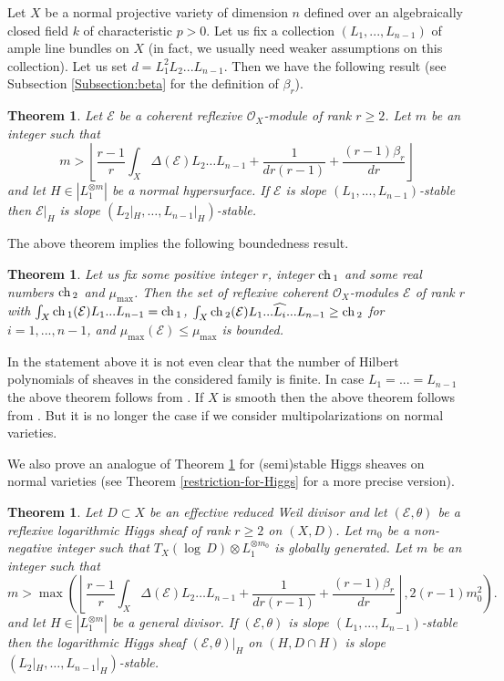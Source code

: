 \documentclass[12pt]{article}
\theoremstyle{plain}
\newtheorem{Theorem}[Thm]{\sc Theorem}
\theoremstyle{definition}
\theoremstyle{remark}
\newcommand{\cE}{{\mathcal E}}
\newcommand{\cO}{{\mathcal O}}
\newcommand{\ch}{{\mathop{\rm ch \, }}}
\begin{document}
Let $X$ be a normal projective variety of dimension $n$ defined over an algebraically closed field $k$ of characteristic $p>0$. Let us fix a collection $(L_1,...,L_{n-1})$ of ample line bundles on $X$ 
(in fact, we usually need weaker assumptions  on this collection).  Let  
us set  $d=L_1^2L_2...L_{n-1}$. Then we have the following 
result (see Subsection \ref{Subsection:beta} for the definition of $\beta_r$).

\begin{Theorem}\label{Main1}
Let  $\cE$ be a coherent reflexive $\cO_X$-module of rank $r\ge 2$. Let  $m$ be an integer such that
$$m>\left\lfloor \frac{r-1}{ r}\int_X\Delta (\cE)L_2\dots L_{n-1} +\frac{1}{dr(r-1)}
+\frac{(r-1)\beta _r}{dr}\right\rfloor $$
and let $H\in |L_1^{\otimes m}|$  be a normal hypersurface.
 If $\cE$ is slope $(L_1,...,L_{n-1})$-stable 	then $\cE|_H$ is  slope $(L_2|_H,\dots ,L_{n-1}|_H)$-stable.
\end{Theorem}

The above theorem implies the following boundedness result. 

\begin{Theorem} \label{Main2}
	Let us fix some positive integer $r$, integer $\ch_1$ and some real
	numbers $\ch _2$ and $\mu _{\max}$. 
	Then the set of reflexive coherent $\cO_X$-modules $\cE$ of rank $r$ with $\int _X \ch_1 (\cE) L_1...L_{n-1}=\ch_1$, $\int _X \ch_2 (\cE) L_1...\widehat{L_i}...L_{n-1} \ge \ch_2$ for $i=1,...,n-1$,  and $\mu _{\max } (\cE)\le \mu _{\max}$ is bounded.
\end{Theorem}

In the statement above it is not even clear that the number of Hilbert polynomials of sheaves in the considered family is finite. In case $L_1=...=L_{n-1}$ the above theorem follows from \cite[Theorem 4.4]{La1}. If $X$ is smooth then the above theorem follows from \cite[Corollary 5.4]{La1}. But
it is no longer the case if we consider multipolarizations on normal varieties.

\medskip

We also prove an analogue of Theorem \ref{Main1}  for  (semi)stable Higgs sheaves on normal varieties (see Theorem \ref{restriction-for-Higgs} for a more precise version).



\begin{Theorem}	\label{Main5}
	Let  $D\subset X$ be an effective reduced Weil divisor and let $(\cE , \theta )$ be a reflexive logarithmic Higgs sheaf of rank $r\ge 2$ on $(X,D)$. 
Let $m_0$ be a non-negative integer such that $T_X (\log \, D)\otimes L_1^{\otimes m_0}$ is globally generated. Let   $m$ be an integer such that
	$$m>\max \left(\left\lfloor \frac{r-1}{ r}\int_X\Delta (\cE)L_2\dots L_{n-1} +\frac{1}{dr(r-1)}
	+\frac{(r-1)\beta _r}{dr}\right\rfloor , 2(r-1)m_0^2 \right).$$
and let $H\in |L_1^{\otimes m}|$ be a general divisor. If  $(\cE , \theta )$ is slope $(L_1,...,L_{n-1})$-stable then the logarithmic Higgs sheaf $(\cE , \theta )|_H$ on $(H,D\cap H)$ is  slope $(L_2|_H,\dots ,L_{n-1}|_H)$-stable.
\end{Theorem}
\end{document}
